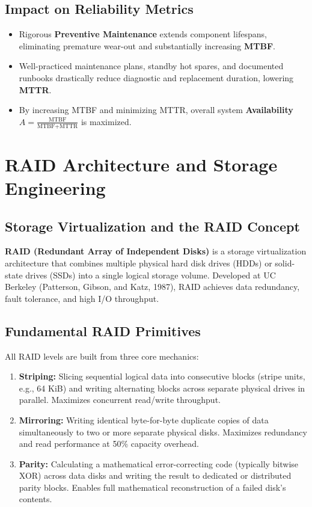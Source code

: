 \subsection{Impact on Reliability Metrics}
\begin{itemize}
    \item Rigorous \textbf{Preventive Maintenance} extends component lifespans, eliminating premature wear-out and substantially increasing \textbf{MTBF}.
    \item Well-practiced maintenance plans, standby hot spares, and documented runbooks drastically reduce diagnostic and replacement duration, lowering \textbf{MTTR}.
    \item By increasing MTBF and minimizing MTTR, overall system \textbf{Availability} $A = \frac{\text{MTBF}}{\text{MTBF} + \text{MTTR}}$ is maximized.
\end{itemize}

\section{RAID Architecture and Storage Engineering}
\label{sec:os_raid}

\subsection{Storage Virtualization and the RAID Concept}
\textbf{RAID (Redundant Array of Independent Disks)} is a storage virtualization architecture that combines multiple physical hard disk drives (HDDs) or solid-state drives (SSDs) into a single logical storage volume. Developed at UC Berkeley (Patterson, Gibson, and Katz, 1987), RAID achieves data redundancy, fault tolerance, and high I/O throughput.

\subsection{Fundamental RAID Primitives}
All RAID levels are built from three core mechanics:
\begin{enumerate}
    \item \textbf{Striping:} Slicing sequential logical data into consecutive blocks (stripe units, e.g., 64 KiB) and writing alternating blocks across separate physical drives in parallel. Maximizes concurrent read/write throughput.
    \item \textbf{Mirroring:} Writing identical byte-for-byte duplicate copies of data simultaneously to two or more separate physical disks. Maximizes redundancy and read performance at 50\% capacity overhead.
    \item \textbf{Parity:} Calculating a mathematical error-correcting code (typically bitwise XOR) across data disks and writing the result to dedicated or distributed parity blocks. Enables full mathematical reconstruction of a failed disk's contents.
\end{enumerate}

